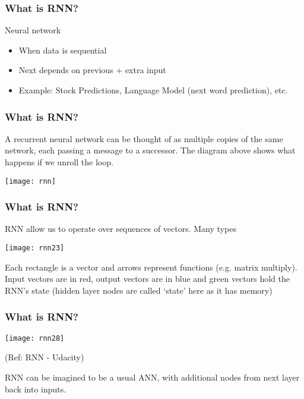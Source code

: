 \begin{frame}[fragile] \frametitle{What is RNN?}
Neural network
\begin{itemize}
\item When data is sequential
\item Next depends on previous + extra input
\item Example: Stock Predictions, Language Model (next word prediction), etc.
\end{itemize}
\end{frame}





\begin{frame}[fragile] \frametitle{What is RNN?}

A recurrent neural network can be thought of as multiple copies of the same network, each passing a message to a successor. 
The diagram above shows what happens if we unroll the loop. 

\begin{center}
\texttt{[image: rnn]}
\end{center}
\end{frame}


\begin{frame}[fragile] \frametitle{What is RNN?}

RNN allow us to operate over sequences of vectors. Many types
\begin{center}
\texttt{[image: rnn23]}
\end{center}
Each rectangle is a vector and arrows represent functions (e.g. matrix multiply). Input vectors are in red, output vectors are in blue and green vectors hold the RNN's state (hidden layer nodes are called `state' here as it has memory)

\end{frame}

\begin{frame}[fragile] \frametitle{What is RNN?}

\begin{center}
\texttt{[image: rnn28]}

\tiny{(Ref: RNN - Udacity)}

\end{center}

RNN can be imagined to be a usual ANN, with additional nodes from next layer back into inputs.
\end{frame}



